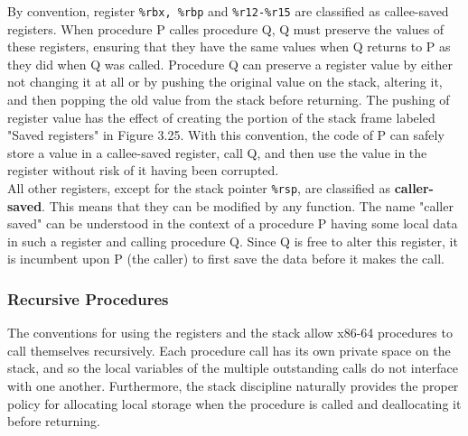 \documentclass[11pt]{article}
\begin{document}
By convention, register \texttt{\%rbx, \%rbp} and \texttt{\%r12-\%r15} are classified as callee-saved registers. When procedure P calles procedure Q, Q must preserve the values of these registers, ensuring that they have the same values when Q returns to P as they did when Q was called. Procedure Q can preserve a register value by either not changing it at all or by pushing the original value on the stack, altering it, and then popping the old value from the stack before returning. The pushing of register value has the effect of creating the portion of the stack frame labeled "Saved registers" in Figure 3.25. With this convention, the code of P can safely store a value in a callee-saved register, call Q, and then use the value in the register without risk of it having been corrupted.\\

All other registers, except for the stack pointer \texttt{\%rsp}, are classified as \textbf{caller-saved}. This means that they can be modified by any function. The name "caller saved" can be understood in the context of a procedure P having some local data in such a register and calling procedure Q. Since Q is free to alter this register, it is incumbent upon P (the caller) to first save the data before it makes the call.\\

\subsubsection{Recursive Procedures}
\label{sec:org84d9c80}
The conventions for using the registers and the stack allow x86-64 procedures to call themselves recursively. Each procedure call has its own private space on the stack, and so the local variables of the multiple outstanding calls do not interface with one another. Furthermore, the stack discipline naturally provides the proper policy for allocating local storage when the procedure is called and deallocating it before returning.\\
\end{document}

